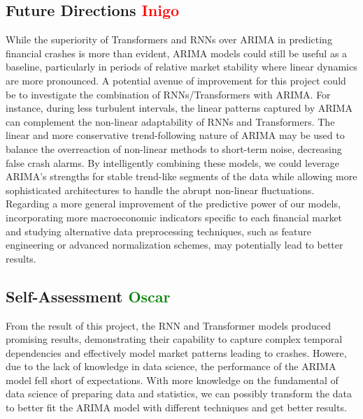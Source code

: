 \documentclass[12pt, letterpaper]{article}
\begin{document}
\subsection*{Future Directions \textcolor{red}{Inigo}}
While the superiority of Transformers and RNNs over ARIMA in predicting financial crashes is more than evident, ARIMA models could still be useful as a baseline, particularly in periods of relative market stability where linear dynamics are more pronounced. A potential avenue of improvement for this project could be to investigate the combination of RNNs/Transformers with ARIMA. For instance, during less turbulent intervals, the linear patterns captured by ARIMA can complement the non-linear adaptability of RNNs and Transformers. The linear and more conservative trend-following nature of ARIMA may be used to balance the overreaction of non-linear methods to short-term noise, decreasing false crash alarms. By intelligently combining these models, we could leverage ARIMA’s strengths for stable trend-like segments of the data while allowing more sophisticated architectures to handle the abrupt non-linear fluctuations. Regarding a more general improvement of the predictive power of our models, incorporating more macroeconomic indicators specific to each financial market and studying alternative data preprocessing techniques, such as feature engineering or advanced normalization schemes, may potentially lead to better results.



\subsection*{Self-Assessment \textcolor{green}{Oscar}}
From the result of this project, the RNN and Transformer models produced promising results, demonstrating their capability to capture complex temporal dependencies and effectively model market patterns leading to crashes. Howere, due to the lack of knowledge in data science, the performance of the ARIMA model fell short of expectations. With more knowledge on the fundamental of data science of preparing data and statistics, we can possibly transform the data to better fit the ARIMA model with different techniques and get better results.

\pagebreak
\end{document}
